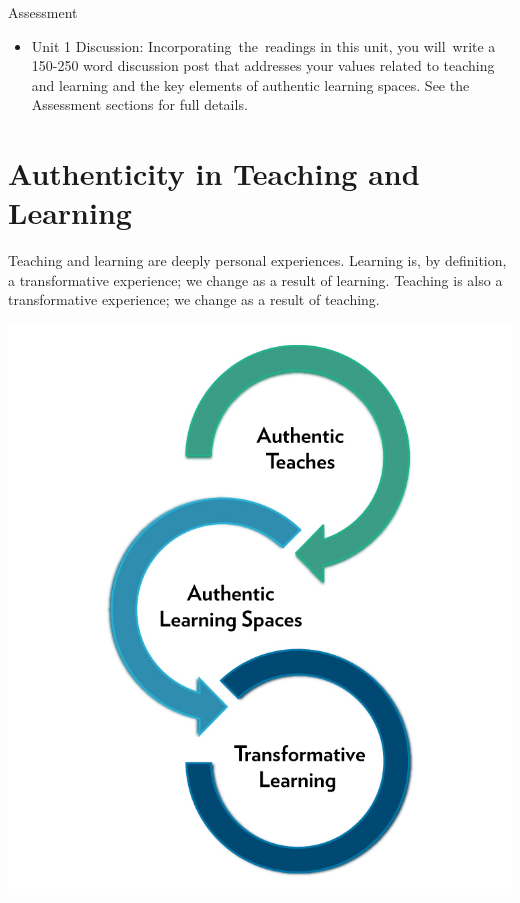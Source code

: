 \documentclass[
]{book}
\providecommand{\tightlist}{%
  \setlength{\itemsep}{0pt}\setlength{\parskip}{0pt}}
\begin{document}
\begin{assessment}
{Assessment}

\begin{itemize}
\tightlist
\item
  Unit 1 Discussion: Incorporating~the~readings in this unit, you will~write a 150-250 word discussion post that addresses your values related to teaching and learning and the key elements of authentic learning spaces. See the Assessment sections for full details.
\end{itemize}
\end{assessment}

\hypertarget{authenticity-in-teaching-and-learning}{%
\section{Authenticity in Teaching and Learning}\label{authenticity-in-teaching-and-learning}}

Teaching and learning are deeply personal experiences. Learning is, by definition, a transformative experience; we change as a result of learning. Teaching is also a transformative experience; we change as a result of teaching.

\includegraphics{assets/unit1/664-authentic-teachers.jpg}
\end{document}
